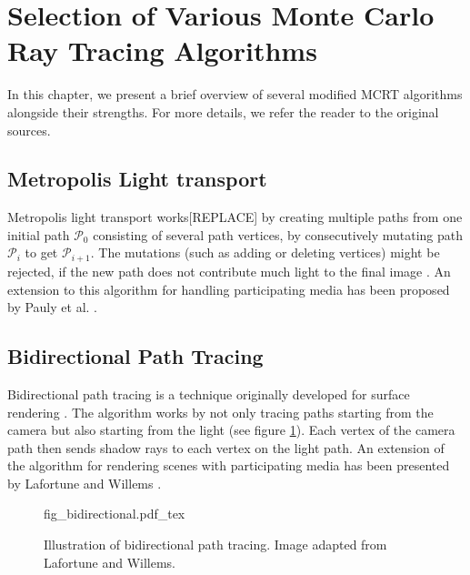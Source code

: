 \section{Selection of Various Monte Carlo Ray Tracing Algorithms}
In this chapter, we present a brief overview of several modified MCRT algorithms alongside their strengths. For more details, we refer the reader to the original sources.
\subsection{Metropolis Light transport}
Metropolis light transport\cite{metropolis} works[REPLACE] by creating multiple paths from one initial path $\mathcal{P}_0$ consisting of several path vertices, by consecutively mutating path $\mathcal{P}_i$ to get $\mathcal{P}_{i+1}$. The mutations (such as adding or deleting vertices) might be rejected, if the new path does not contribute much light to the final image \cite{metropolis}. An extension to this algorithm for handling participating media has been proposed by Pauly et al. \cite{10.1007/978-3-7091-6303-0_2}.
\subsection{Bidirectional Path Tracing}
Bidirectional path tracing is a technique originally developed for surface rendering \cite{bidirectional-ray-tracing}. The algorithm works by not only tracing paths starting from the camera but also starting from the light (see figure \ref{fig:bidirectional}). Each vertex of the camera path then sends shadow rays to each vertex on the light path. An extension of the algorithm for rendering scenes with participating media has been presented by  Lafortune and Willems \cite{10.5555/275458.275468}.
\begin{figure}
\centering
\def\svgwidth{\columnwidth}
{fig_bidirectional.pdf_tex}

\caption{Illustration of bidirectional path tracing. Image adapted from Lafortune and Willems\cite{10.5555/275458.275468}.}
\label{fig:bidirectional}
\end{figure}

